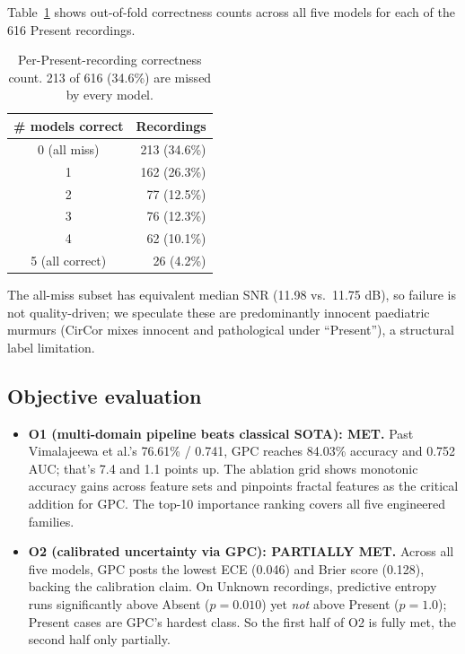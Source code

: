 \documentclass[10pt,twocolumn]{article}
\begin{document}
Table~\ref{tab:err} shows out-of-fold correctness counts across all five models for each of the 616 Present recordings.

\begin{table}[!htbp]
\centering
\caption{Per-Present-recording correctness count. 213 of 616 (34.6\%) are missed by every model.}
\label{tab:err}
\small
\begin{tabular}{cr}
\toprule
\textbf{\# models correct} & \textbf{Recordings} \\
\midrule
0 (all miss)    & 213 (34.6\%) \\
1               & 162 (26.3\%) \\
2               & \phantom{0}77 (12.5\%) \\
3               & \phantom{0}76 (12.3\%) \\
4               & \phantom{0}62 (10.1\%) \\
5 (all correct) & \phantom{0}26 (\phantom{0}4.2\%) \\
\bottomrule
\end{tabular}
\end{table}

The all-miss subset has equivalent median SNR (11.98 vs.\ 11.75 dB), so failure is not quality-driven; we speculate these are predominantly innocent paediatric murmurs (CirCor mixes innocent and pathological under ``Present''), a structural label limitation.
\FloatBarrier

\subsection{Objective evaluation}

\begin{itemize}[leftmargin=*, itemsep=0.05em]
    \item \textbf{O1 (multi-domain pipeline beats classical SOTA): MET.} Past Vimalajeewa et al.'s 76.61\% / 0.741, GPC reaches 84.03\% accuracy and 0.752 AUC; that's 7.4 and 1.1 points up. The ablation grid shows monotonic accuracy gains across feature sets and pinpoints fractal features as the critical addition for GPC. The top-10 importance ranking covers all five engineered families.
    \item \textbf{O2 (calibrated uncertainty via GPC): PARTIALLY MET.} Across all five models, GPC posts the lowest ECE (0.046) and Brier score (0.128), backing the calibration claim. On Unknown recordings, predictive entropy runs significantly above Absent ($p = 0.010$) yet \textit{not} above Present ($p = 1.0$); Present cases are GPC's hardest class. So the first half of O2 is fully met, the second half only partially.
\end{itemize}
\end{document}
